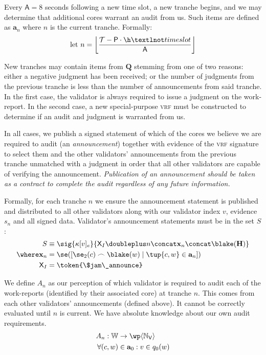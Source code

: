 Every $\mathsf{A} = 8$ seconds following a new time slot, a new tranche begins, and we may determine that additional cores warrant an audit from us. Such items are defined as $\mathbf{a}_n$ where $n$ is the current tranche. Formally:
\begin{equation}
  \using n = \ffrac{\mathcal{T} - \mathsf{P}\cdot\h¬timeslot}{\mathsf{A}}
\end{equation}

New tranches may contain items from $\mathbf{Q}$ stemming from one of two reasons: either a negative judgment has been received; or the number of judgments from the previous tranche is less than the number of announcements from said tranche. In the first case, the validator is always required to issue a judgment on the work-report. In the second case, a new special-purpose \textsc{vrf} must be constructed to determine if an audit and judgment is warranted from us.

In all cases, we publish a signed statement of which of the cores we believe we are required to audit (an \emph{announcement}) together with evidence of the \textsc{vrf} signature to select them and the other validators' announcements from the previous tranche unmatched with a judgment in order that all other validators are capable of verifying the announcement. \emph{Publication of an announcement should be taken as a contract to complete the audit regardless of any future information.}

Formally, for each tranche $n$ we ensure the announcement statement is published and distributed to all other validators along with our validator index $v$, evidence $s_n$ and all signed data. Validator's announcement statements must be in the set $S$:
\begin{align}
  S &\equiv \sig{\kappa[v]_e}{\mathsf{X}_I \doubleplus n \concat \mathbf{x}_n \concat \blake(\mathbf{H})} \\
  \where \mathbf{x}_n &= \se([\se_2(c) \frown \blake(w) \mid \tup{c, w} \in \mathbf{a}_n])\\
  \mathsf{X}_I &= \token{\$jam\_announce}
\end{align}

We define $A_n$ as our perception of which validator is required to audit each of the work-reports (identified by their associated core) at tranche $n$. This comes from each other validators' announcements (defined above). It cannot be correctly evaluated until $n$ is current. We have absolute knowledge about our own audit requirements.
\begin{align}
  A_n: \workreport &\to \powset{\N_\mathsf{V}} \\
  \forall (c, w) &\in \mathbf{a}_0 : v \in q_0(w)
\end{align}

